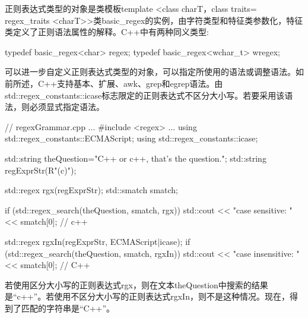 

正则表达式类型的对象是类模板template <class charT，class traits= regex\_traits <charT>{}>类basic\_regex的实例，由字符类型和特征类参数化，特征类定义了正则语法属性的解释。C++中有两种同义类型:

\begin{cpp}
typedef basic_regex<char> regex;
typedef basic_regex<wchar_t> wregex;
\end{cpp}

可以进一步自定义正则表达式类型的对象，可以指定所使用的语法或调整语法。如前所述，C++支持基本、扩展、awk、grep和egrep语法。由std::regex\_constants::icase标志限定的正则表达式不区分大小写。若要采用该语法，则必须显式指定语法。


\begin{cpp}
// regexGrammar.cpp
...
#include <regex>
...
using std::regex_constants::ECMAScript;
using std::regex_constants::icase;

std::string theQuestion="C++ or c++, that's the question.";
std::string regExprStr(R"(c\+\+)");

std::regex rgx(regExprStr);
std::smatch smatch;

if (std::regex_search(theQuestion, smatch, rgx)){
	std::cout << "case sensitive: " << smatch[0]; // c++
}

std::regex rgxIn(regExprStr, ECMAScript|icase);
if (std::regex_search(theQuestion, smatch, rgxIn)){
	std::cout << "case insensitive: " << smatch[0]; // C++
}
\end{cpp}

若使用区分大小写的正则表达式rgx，则在文本theQuestion中搜索的结果是“c++”。若使用不区分大小写的正则表达式rgxIn，则不是这种情况。现在，得到了匹配的字符串是“C++”。



























